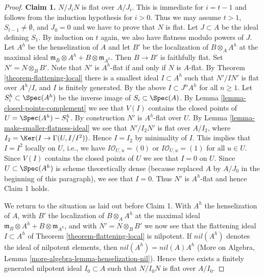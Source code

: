 \begin{proof}
\medskip\noindent
{\bf Claim 1.} $N/J_iN$ is flat over $A/J_i$. This is immediate for
$i = t - 1$ and follows from the induction hypothesis for $i > 0$.
Thus we may assume $t > 1$, $S_{t - 1} \not = \emptyset$, and
$J_0 = 0$ and we have to prove that $N$ is flat. Let $J \subset A$
be the ideal defining $S_1$. By induction on $t$ again, we also
have flatness modulo powers of $J$. Let $A^h$ be the henselization of $A$
and let $B'$ be the localization of $B \otimes_A A^h$ at the maximal ideal
$\mathfrak m_B \otimes A^h + B \otimes \mathfrak m_{A^h}$. Then $B \to B'$
is faithfully flat. Set $N' = N \otimes_B B'$. Note that $N'$
is $A^h$-flat if and only if $N$ is $A$-flat. By
Theorem \ref{theorem-flattening-local} there is a smallest ideal
$I \subset A^h$ such that $N'/IN'$ is flat over $A^h/I$, and
$I$ is finitely generated. By the above $I \subset J^nA^h$ for
all $n \geq 1$. Let $S_i^h \subset \Spec(A^h)$ be the inverse image
of $S_i \subset \Spec(A)$. By Lemma \ref{lemma-closed-points-complement}
we see that $V(I)$ contains the closed points of $U = \Spec(A^h) - S_1^h$.
By construction $N'$ is $A^h$-flat over $U$.
By Lemma \ref{lemma-make-smaller-flatness-ideal} we see that $N'/I_2N'$
is flat over $A/I_2$, where
$I_2 = \Ker(I \to \Gamma(U, I/I^2))$. Hence $I = I_2$ by minimality
of $I$. This implies that $I = I^2$ locally on $U$, i.e.,
we have $I\mathcal{O}_{U, u} = (0)$ or $I\mathcal{O}_{U, u} = (1)$
for all $u \in U$. Since $V(I)$ contains the closed points of $U$
we see that $I = 0$ on $U$. Since $U \subset \Spec(A^h)$ is scheme
theoretically dense (because replaced $A$ by $A/J_0$ in the beginning
of this paragraph), we see that $I = 0$. Thus $N'$ is $A^h$-flat
and hence Claim 1 holds.

\medskip\noindent
We return to the situation as laid out before Claim 1. With
$A^h$ the henselization of $A$, with $B'$ the localization
of $B \otimes_A A^h$ at the maximal ideal
$\mathfrak m_B \otimes A^h + B \otimes \mathfrak m_{A^h}$, and with
$N' = N \otimes_B B'$ we now see that the flattening ideal $I \subset A^h$
of Theorem \ref{theorem-flattening-local} is nilpotent.
If $nil(A^h)$ denotes the ideal of nilpotent elements, then
$nil(A^h) = nil(A) A^h$
(More on Algebra, Lemma \ref{more-algebra-lemma-henselization-nil}).
Hence there exists a finitely generated
nilpotent ideal $I_0 \subset A$ such that $N/I_0N$ is flat over $A/I_0$.


\end{proof}
